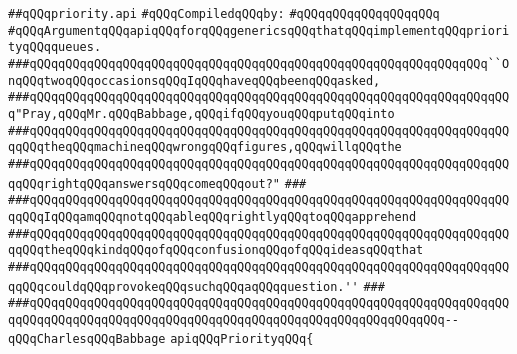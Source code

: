 \label{src/lib/src/priority.api}
\verb|##qQQqpriority.api|\newline
\newline
\verb|#qQQqCompiledqQQqby:|\newline
\verb|#qQQqqQQqqQQqqQQqqQQq|\newline
\newline
\newline
\newline
\verb|#qQQqArgumentqQQqapiqQQqforqQQqgenericsqQQqthatqQQqimplementqQQqpriorityqQQqqueues.|\newline
\newline
\newline
\newline
\verb|###qQQqqQQqqQQqqQQqqQQqqQQqqQQqqQQqqQQqqQQqqQQqqQQqqQQqqQQqqQQqqQQq``OnqQQqtwoqQQqoccasionsqQQqIqQQqhaveqQQqbeenqQQqasked,|\newline
\verb|###qQQqqQQqqQQqqQQqqQQqqQQqqQQqqQQqqQQqqQQqqQQqqQQqqQQqqQQqqQQqqQQqqQQq"Pray,qQQqMr.qQQqBabbage,qQQqifqQQqyouqQQqputqQQqinto|\newline
\verb|###qQQqqQQqqQQqqQQqqQQqqQQqqQQqqQQqqQQqqQQqqQQqqQQqqQQqqQQqqQQqqQQqqQQqqQQqtheqQQqmachineqQQqwrongqQQqfigures,qQQqwillqQQqthe|\newline
\verb|###qQQqqQQqqQQqqQQqqQQqqQQqqQQqqQQqqQQqqQQqqQQqqQQqqQQqqQQqqQQqqQQqqQQqqQQqrightqQQqanswersqQQqcomeqQQqout?"|\newline
\verb|###|\newline
\verb|###qQQqqQQqqQQqqQQqqQQqqQQqqQQqqQQqqQQqqQQqqQQqqQQqqQQqqQQqqQQqqQQqqQQqqQQqIqQQqamqQQqnotqQQqableqQQqrightlyqQQqtoqQQqapprehend|\newline
\verb|###qQQqqQQqqQQqqQQqqQQqqQQqqQQqqQQqqQQqqQQqqQQqqQQqqQQqqQQqqQQqqQQqqQQqqQQqtheqQQqkindqQQqofqQQqconfusionqQQqofqQQqideasqQQqthat|\newline
\verb|###qQQqqQQqqQQqqQQqqQQqqQQqqQQqqQQqqQQqqQQqqQQqqQQqqQQqqQQqqQQqqQQqqQQqqQQqcouldqQQqprovokeqQQqsuchqQQqaqQQqquestion.''|\newline
\verb|###|\newline
\verb|###qQQqqQQqqQQqqQQqqQQqqQQqqQQqqQQqqQQqqQQqqQQqqQQqqQQqqQQqqQQqqQQqqQQqqQQqqQQqqQQqqQQqqQQqqQQqqQQqqQQqqQQqqQQqqQQqqQQqqQQqqQQqqQQq--qQQqCharlesqQQqBabbage|\newline
\newline
\newline
\newline
\verb|apiqQQqPriorityqQQq{|\newline
